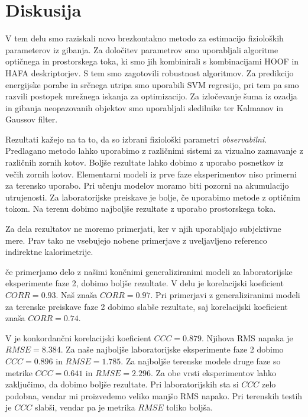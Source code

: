 \chapter{Diskusija}\label{sec:diskusija}
V tem delu smo raziskali novo brezkontakno metodo za estimacijo fizioloških parameterov iz gibanja. Za določitev parametrov smo uporabljali algoritme optičnega in prostorskega toka, ki smo jih kombinirali s kombinacijami HOOF in HAFA deskriptorjev. S tem smo zagotovili robustnost algoritmov. Za predikcijo energijske porabe in srčnega utripa smo uporabili SVM regresijo, pri tem pa smo razvili \nurbf postopek mrežnega iskanja za optimizacijo. Za izločevanje šuma iz ozadja in gibanja neopazovanih objektov smo uporabljali sledilnike ter Kalmanov in Gaussov filter.

Rezultati kažejo na ta to, da so izbrani fiziološki parametri \emph{observabilni}. Predlagano metodo lahko uporabimo z različnimi sistemi za vizualno zaznavanje z različnih zornih kotov. Boljše rezultate lahko dobimo z uporabo posnetkov iz večih zornih kotov. Elementarni modeli iz prve faze eksperimentov niso primerni za terensko uporabo. Pri učenju modelov moramo biti pozorni na akumulacijo utrujenosti. Za laboratorijske preiskave je bolje, če uporabimo metode z optičnim tokom. Na terenu dobimo najboljše rezultate z uporabo prostorskega toka.

Za dela \cite{peker2004framework,silva2015assessing,osgnach2010energy} rezultatov ne moremo primerjati, ker v njih uporabljajo subjektivne mere. Prav tako ne vsebujejo nobene primerjave z uveljavljeno referenco indirektne kalorimetrije.

če primerjamo delo \cite{botton2011energy} z našimi končnimi generaliziranimi modeli za laboratorijske eksperimente faze 2, dobimo boljše rezultate. V delu \cite{botton2011energy} je korelacijski koeficient $CORR=0.93$. Naš znaša $CORR=0.97$. Pri primerjavi z generaliziranimi modeli za terenske preiskave faze 2 dobimo slabše rezultate, saj korelacijski koeficient znaša $CORR=0.74$.

V \cite{nathan2015estimating} je konkordančni korelacijski koeficient $CCC=0.879$. Njihova RMS napaka je $RMSE=8.384$. Za naše najboljše laboratorijske eksperimente faze 2 dobimo $CCC=0.896$ in $RMSE=1.785$. Za najboljše terenske modele druge faze so metrike  $CCC=0.641$ in $RMSE=2.296$. Za obe vrsti eksperimentov lahko zaključimo, da dobimo boljše rezultate. Pri laboratorijskih sta si $CCC$ zelo podobna, vendar mi proizvedemo veliko manjšo RMS napako. Pri terenskih testih je $CCC$ slabši, vendar pa je metrika $RMSE$ toliko boljša.

